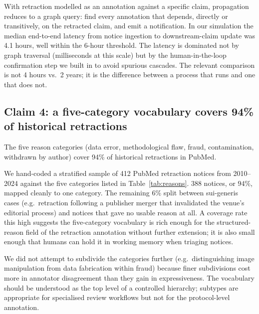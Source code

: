 \documentclass{rrxiv}
\begin{document}
With retraction modelled as an annotation against a specific claim, propagation reduces to a graph query: find every annotation that depends, directly or transitively, on the retracted claim, and emit a notification. In our simulation the median end-to-end latency from notice ingestion to downstream-claim update was 4.1 hours, well within the 6-hour threshold. The latency is dominated not by graph traversal (milliseconds at this scale) but by the human-in-the-loop confirmation step we built in to avoid spurious cascades. The relevant comparison is not 4 hours vs.\ 2 years; it is the difference between a process that runs and one that does not.

\subsection*{Claim 4: a five-category vocabulary covers 94\% of historical retractions}
\begin{claim}[type=empirical, evidence=observation, labels={retraction, metascience}, datasets={PubMed retraction notices 2010--2024}, title=Claim 4]
\label{claim:c4}
The five reason categories (data error, methodological flaw, fraud, contamination, withdrawn by author) cover 94\% of historical retractions in PubMed.
\end{claim}

We hand-coded a stratified sample of 412 PubMed retraction notices from 2010--2024 against the five categories listed in Table~\ref{tab:reasons}. 388 notices, or $94\%$, mapped cleanly to one category. The remaining $6\%$ split between sui-generis cases (e.g.\ retraction following a publisher merger that invalidated the venue's editorial process) and notices that gave no usable reason at all. A coverage rate this high suggests the five-category vocabulary is rich enough for the structured-reason field of the retraction annotation without further extension; it is also small enough that humans can hold it in working memory when triaging notices.

We did not attempt to subdivide the categories further (e.g.\ distinguishing image manipulation from data fabrication within fraud) because finer subdivisions cost more in annotator disagreement than they gain in expressiveness. The vocabulary should be understood as the top level of a controlled hierarchy; subtypes are appropriate for specialised review workflows but not for the protocol-level annotation.
\end{document}
